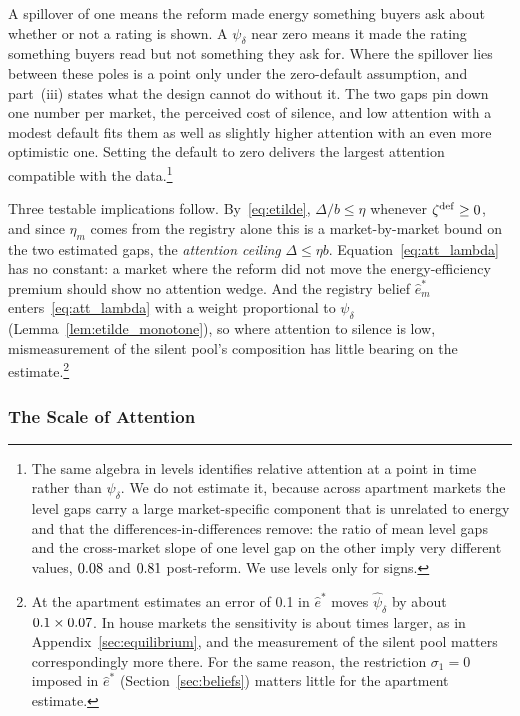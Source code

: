 A spillover of one means the reform made energy something buyers ask about whether or not a rating is shown. A $\psi_\delta$ near zero means it made the rating something buyers read but not something they ask for. Where the spillover lies between these poles is a point only under the zero-default assumption, and part~(iii) states what the design cannot do without it. The two gaps pin down one number per market, the perceived cost of silence, and low attention with a modest default fits them as well as slightly higher attention with an even more optimistic one. Setting the default to zero delivers the largest attention compatible with the data.\footnote{The same algebra in levels identifies relative attention at a point in time rather than $\psi_\delta$. We do not estimate it, because across apartment markets the level gaps carry a large market-specific component that is unrelated to energy and that the differences-in-differences remove: the ratio of mean level gaps and the cross-market slope of one level gap on the other imply very different values, $0.08$ and $0.81$ post-reform. We use levels only for signs.}

Three testable implications follow. By~\eqref{eq:etilde}, $\Delta/b\le\eta$ whenever $\zeta^{\rm def}\ge0$, and since $\eta_m$ comes from the registry alone this is a market-by-market bound on the two estimated gaps, the \emph{attention ceiling} $\Delta\le\eta b$. Equation~\eqref{eq:att_lambda} has no constant: a market where the reform did not move the energy-efficiency premium should show no attention wedge. And the registry belief $\hat e^*_m$ enters~\eqref{eq:att_lambda} with a weight proportional to $\psi_\delta$ (Lemma~\ref{lem:etilde_monotone}), so where attention to silence is low, mismeasurement of the silent pool's composition has little bearing on the estimate.\footnote{At the apartment estimates an error of 0.1 in $\hat e^*$ moves $\hat\psi_\delta$ by about $0.1\times0.07$. In house markets the sensitivity is about \attSensRatio{} times larger, as in Appendix~\ref{sec:equilibrium}, and the measurement of the silent pool matters correspondingly more there. For the same reason, the restriction $\sigma_1=0$ imposed in $\hat e^*$ (Section~\ref{sec:beliefs}) matters little for the apartment estimate.}

\subsubsection{The Scale of Attention}

